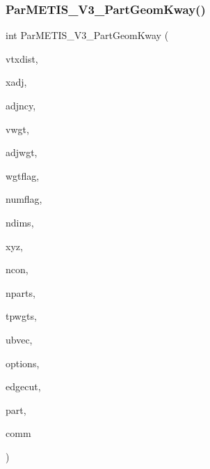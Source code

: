 \subsubsection{\texorpdfstring{Par\+M\+E\+T\+I\+S\+\_\+\+V3\+\_\+\+Part\+Geom\+Kway()}{ParMETIS\_V3\_PartGeomKway()}}
{\footnotesize\ttfamily int Par\+M\+E\+T\+I\+S\+\_\+\+V3\+\_\+\+Part\+Geom\+Kway (\begin{DoxyParamCaption}\item[{\hyperlink{a00876_aaa5262be3e700770163401acb0150f52}{idx\+\_\+t} $\ast$}]{vtxdist,  }\item[{\hyperlink{a00876_aaa5262be3e700770163401acb0150f52}{idx\+\_\+t} $\ast$}]{xadj,  }\item[{\hyperlink{a00876_aaa5262be3e700770163401acb0150f52}{idx\+\_\+t} $\ast$}]{adjncy,  }\item[{\hyperlink{a00876_aaa5262be3e700770163401acb0150f52}{idx\+\_\+t} $\ast$}]{vwgt,  }\item[{\hyperlink{a00876_aaa5262be3e700770163401acb0150f52}{idx\+\_\+t} $\ast$}]{adjwgt,  }\item[{\hyperlink{a00876_aaa5262be3e700770163401acb0150f52}{idx\+\_\+t} $\ast$}]{wgtflag,  }\item[{\hyperlink{a00876_aaa5262be3e700770163401acb0150f52}{idx\+\_\+t} $\ast$}]{numflag,  }\item[{\hyperlink{a00876_aaa5262be3e700770163401acb0150f52}{idx\+\_\+t} $\ast$}]{ndims,  }\item[{\hyperlink{a00876_a1924a4f6907cc3833213aba1f07fcbe9}{real\+\_\+t} $\ast$}]{xyz,  }\item[{\hyperlink{a00876_aaa5262be3e700770163401acb0150f52}{idx\+\_\+t} $\ast$}]{ncon,  }\item[{\hyperlink{a00876_aaa5262be3e700770163401acb0150f52}{idx\+\_\+t} $\ast$}]{nparts,  }\item[{\hyperlink{a00876_a1924a4f6907cc3833213aba1f07fcbe9}{real\+\_\+t} $\ast$}]{tpwgts,  }\item[{\hyperlink{a00876_a1924a4f6907cc3833213aba1f07fcbe9}{real\+\_\+t} $\ast$}]{ubvec,  }\item[{\hyperlink{a00876_aaa5262be3e700770163401acb0150f52}{idx\+\_\+t} $\ast$}]{options,  }\item[{\hyperlink{a00876_aaa5262be3e700770163401acb0150f52}{idx\+\_\+t} $\ast$}]{edgecut,  }\item[{\hyperlink{a00876_aaa5262be3e700770163401acb0150f52}{idx\+\_\+t} $\ast$}]{part,  }\item[{M\+P\+I\+\_\+\+Comm $\ast$}]{comm }\end{DoxyParamCaption})}

